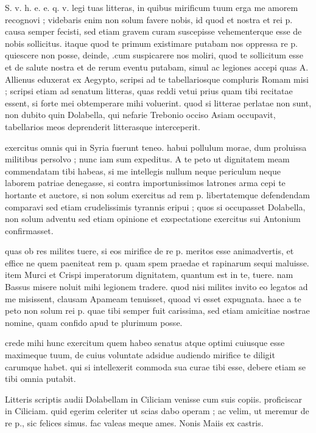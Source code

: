 


 S. v. h. e. e. q. v. legi tuas litteras, in quibus mirificum tuum erga me amorem recognovi ; videbaris enim non solum favere nobis, id quod et nostra et rei p. causa semper fecisti, sed etiam gravem curam suscepisse vehementerque esse de nobis sollicitus. itaque quod te primum existimare putabam nos oppressa re p. quiescere non posse, deinde, .cum suspicarere nos moliri, quod te sollicitum esse et de salute nostra et de rerum eventu putabam, simul ac legiones accepi quas A. Allienus eduxerat ex Aegypto, scripsi ad te tabellariosque compluris Romam misi ; scripsi etiam ad senatum litteras, quas reddi vetui prius quam tibi recitatae essent, si forte mei obtemperare mihi voluerint. quod si litterae perlatae non sunt, non dubito quin Dolabella, qui nefarie Trebonio occiso Asiam occupavit, tabellarios meos deprenderit litterasque interceperit.

 exercitus omnis qui in Syria fuerunt teneo. habui pollulum morae, dum proluissa militibus persolvo ; nunc iam sum expeditus. A te peto ut dignitatem meam commendatam tibi habeas, si me intellegis nullum neque periculum neque laborem patriae denegasse, si contra importunissimos latrones arma cepi te hortante et auctore, si non solum exercitus ad rem p. libertatemque defendendam comparavi sed etiam crudelissimis tyrannis eripui ; quos si occupasset Dolabella, non solum adventu sed etiam opinione et exspectatione exercitus sui Antonium confirmasset.

 quas ob res milites tuere, si eos mirifice de re p. meritos esse animadvertis, et effice ne quem paeniteat rem p. quam spem praedae et rapinarum sequi maluisse. item Murci et Crispi imperatorum dignitatem, quantum est in te, tuere. nam Bassus misere noluit mihi legionem tradere. quod nisi milites invito eo legatos ad me misissent, clausam Apameam tenuisset, quoad vi esset expugnata. haec a te peto non solum rei p. quae tibi semper fuit carissima, sed etiam amicitiae nostrae nomine, quam confido apud te plurimum posse.

 crede mihi hunc exercitum quem habeo senatus atque optimi cuiusque esse maximeque tuum, de cuius voluntate adsidue audiendo mirifice te diligit carumque habet. qui si intellexerit commoda sua curae tibi esse, debere etiam se tibi omnia putabit.

 Litteris scriptis audii Dolabellam in Ciliciam venisse cum suis copiis. proficiscar in Ciliciam. quid egerim celeriter ut scias dabo operam ; ac velim, ut meremur de re p., sic felices simus. fac valeas meque ames. Nonis Maiis ex castris.
